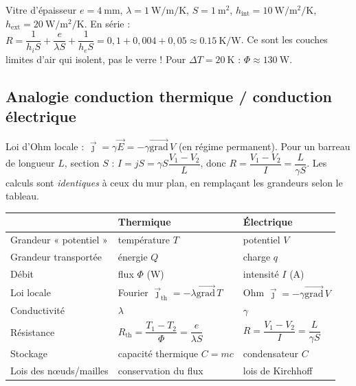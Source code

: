 \documentclass[11pt,a4paper]{article}
\newcommand{\vect}[1]{\overrightarrow{#1}}
\newcommand{\jth}{\vec{\jmath}_{\mathrm{th}}}
\newcommand{\grad}{\vect{\mathrm{grad}}\,}
\begin{document}
\begin{exemple}[title={Exemple : simple vitrage}]
Vitre d'épaisseur $e=\SI{4}{\milli\metre}$, $\lambda=\SI{1}{\watt\per\metre\per\kelvin}$,
$S=\SI{1}{\square\metre}$, $h_{\text{int}}=\SI{10}{\watt\per\square\metre\per\kelvin}$, $h_{\text{ext}}=\SI{20}{\watt\per\square\metre\per\kelvin}$.
En série : $R=\dfrac1{h_iS}+\dfrac{e}{\lambda S}+\dfrac{1}{h_eS}
=0{,}1+0{,}004+0{,}05\approx\SI{0.15}{\kelvin\per\watt}$.
Ce sont les couches limites d'air qui isolent, pas le verre ! Pour
$\Delta T=\SI{20}{\kelvin}$ : $\Phi\approx\SI{130}{\watt}$.
\end{exemple}

\subsection{Analogie conduction thermique / conduction électrique}

\begin{demo}[title={Démonstration : la résistance électrique d'un conducteur ohmique}]
Loi d'Ohm locale : $\vec\jmath=\gamma\vec E=-\gamma\grad V$ (en régime permanent). Pour un
barreau de longueur $L$, section $S$ : $I=jS=\gamma S\dfrac{V_1-V_2}{L}$, donc
$R=\dfrac{V_1-V_2}{I}=\dfrac{L}{\gamma S}$. Les calculs sont \emph{identiques} à ceux du mur
plan, en remplaçant les grandeurs selon le tableau.
\end{demo}

\begin{center}
\renewcommand{\arraystretch}{1.4}
\begin{tabular}{lll}
\toprule
 & \textbf{Thermique} & \textbf{Électrique} \\
\midrule
Grandeur « potentiel » & température $T$ & potentiel $V$ \\
Grandeur transportée & énergie $Q$ & charge $q$ \\
Débit & flux $\Phi$ (\si{\watt}) & intensité $I$ (\si{\ampere}) \\
Loi locale & Fourier $\jth=-\lambda\grad T$ & Ohm $\vec\jmath=-\gamma\grad V$ \\
Conductivité & $\lambda$ & $\gamma$ \\
Résistance & $R_{\mathrm{th}}=\dfrac{T_1-T_2}{\Phi}=\dfrac{e}{\lambda S}$ & $R=\dfrac{V_1-V_2}{I}=\dfrac{L}{\gamma S}$ \\
Stockage & capacité thermique $C=mc$ & condensateur $C$ \\
Lois des nœuds/mailles & conservation du flux & lois de Kirchhoff \\
\bottomrule
\end{tabular}
\end{center}
\end{document}
